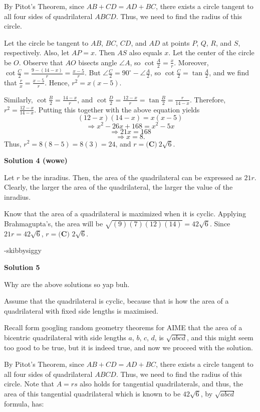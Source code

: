 \begin{enumerate}
By Pitot's Theorem, since $AB+CD=AD+BC$, there exists a circle tangent to all four sides of quadrilateral $ABCD$. Thus, we need to find the radius of this circle.

 Let the circle be tangent to $AB$, $BC$, $CD$, and $AD$ at points $P$, $Q$, $R$, and $S$, respectively. Also, let $AP=x$. Then $AS$ also equals $x$. Let the center of the circle be $O$. Observe that $AO$ bisects angle $\angle A$, so $\cot\frac{A}{2}=\frac{x}{r}$. Moreover, $\cot\frac{C}{2}=\frac{9-(14-x)}{r}=\frac{x-5}{r}$. But $\angle \frac{C}{2}=90^\circ-\angle \frac{A}{2}$, so $\cot\frac{C}{2}=\tan\frac{A}{2}$, and we find that $\frac{r}{x}=\frac{x-5}{r}$. Hence, $r^2=x(x-5)$.

 Similarly, $\cot\frac{B}{2}=\frac{14-x}{r}$, and $\cot\frac{D}{2}=\frac{12-x}{r}=\tan\frac{B}{2}=\frac{r}{14-x}$. Therefore, $r^2=\frac{12-x}{14-x}$. Putting this together with the above equation yields 
 \[(12-x)(14-x)=x(x-5)\]
 \[\Longrightarrow x^2-26x+168=x^2-5x\]
 \[\Longrightarrow 21x=168\]
 \[\Longrightarrow x=8.\] Thus, $r^2=8(8-5)=8(3)=24$, and $r=\boxed{\textbf{(C)}\ 2\sqrt{6}}$.

 


 



\textbf{Solution 4 (wowe)}

Let $r$ be the inradius. Then, the area of the quadrilateral can be expressed as $21r$. Clearly, the larger the area of the quadrilateral, the larger the value of the inradius.

 
Know that the area of a quadrilateral is maximized when it is cyclic. Applying Brahmagupta's, the area will be $\sqrt{(9)(7)(12)(14)} = 42\sqrt{6}$. Since $21r = 42\sqrt{6}$, $r = \boxed{\textbf{(C) } 2\sqrt6}$.

 -skibbysiggy

 



\textbf{Solution 5}

Why are the above solutions so yap buh.

 Assume that the quadrilateral is cyclic, because that is how the area of a quadrilateral with fixed side lengths is maximised.

 Recall form googling random geometry theorems for AIME that the area of a bicentric quadrilateral with side lengths $a$, $b$, $c$, $d$, is $\sqrt{abcd}$, and this might seem too good to be true, but it is indeed true, and now we proceed with the solution.

 By Pitot's Theorem, since $AB+CD=AD+BC$, there exists a circle tangent to all four sides of quadrilateral $ABCD$. Thus, we need to find the radius of this circle. Note that $A = rs$ also holds for tangential quadrilaterals, and thus, the area of this tangential quadrilateral which is known to be $42\sqrt{6}$, by $\sqrt{abcd}$ formula, has:


\end{enumerate}
